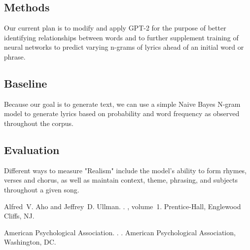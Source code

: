 \documentclass[11pt]{article}
\begin{document}
\subsection{Methods} %
Our current plan is to modify and apply GPT-2 for the purpose of better identifying relationships between words and to further supplement training of neural networks to predict varying n-grams of lyrics ahead of an initial word or phrase.
\subsection{Baseline} %
Because our goal is to generate text, we can use a simple Naive Bayes N-gram model to generate lyrics based on probability and word frequency as observed throughout the corpus.
\subsection{Evaluation} %
Different ways to measure "Realism" include the model's ability to form rhymes, verses and chorus, as well as maintain context, theme, phrasing, and subjects throughout a given song.


%
%

\begin{thebibliography}{}

Alfred~V. Aho and Jeffrey~D. Ullman.
.
, volume~1.
\newblock Prentice-{Hall}, Englewood Cliffs, NJ.

{American Psychological Association}.
.
.
\newblock American Psychological Association, Washington, DC.



\end{thebibliography}
\end{document}
